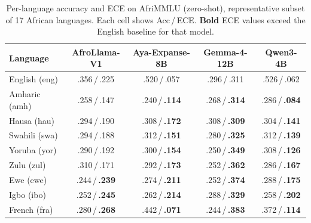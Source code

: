 \documentclass[11pt,a4paper]{article}
\begin{document}
\begin{table}[H]
\centering
\caption{Per-language accuracy and ECE on AfriMMLU (zero-shot), representative
  subset of 17 African languages. Each cell shows Acc\,/\,ECE.
  \textbf{Bold} ECE values exceed the English baseline for that model.}
\label{tab:afrimmlu_lang}
\small
\begin{tabular}{lcccc}
\toprule
\textbf{Language} & \textbf{AfroLlama-V1} & \textbf{Aya-Expanse-8B}
                  & \textbf{Gemma-4-12B}  & \textbf{Qwen3-4B} \\
\midrule
English (eng) & .356\,/\,.225 & .520\,/\,.057 & .296\,/\,.311 & .526\,/\,.062 \\
\midrule
Amharic (amh) & .258\,/\,.147 & .240\,/\,\textbf{.114} & .268\,/\,\textbf{.314} & .286\,/\,\textbf{.084} \\
Hausa (hau)   & .294\,/\,.190 & .308\,/\,\textbf{.172} & .308\,/\,\textbf{.309} & .304\,/\,\textbf{.141} \\
Swahili (swa) & .294\,/\,.188 & .312\,/\,\textbf{.151} & .280\,/\,\textbf{.325} & .312\,/\,\textbf{.139} \\
Yoruba (yor)  & .290\,/\,.192 & .300\,/\,\textbf{.154} & .250\,/\,\textbf{.349} & .308\,/\,\textbf{.126} \\
Zulu (zul)    & .310\,/\,.171 & .292\,/\,\textbf{.173} & .252\,/\,\textbf{.362} & .286\,/\,\textbf{.167} \\
Ewe (ewe)     & .244\,/\,\textbf{.239} & .274\,/\,\textbf{.211} & .252\,/\,\textbf{.374} & .288\,/\,\textbf{.175} \\
Igbo (ibo)    & .252\,/\,\textbf{.245} & .262\,/\,\textbf{.214} & .288\,/\,\textbf{.329} & .258\,/\,\textbf{.202} \\
French (fra)  & .280\,/\,\textbf{.268} & .442\,/\,\textbf{.071} & .244\,/\,\textbf{.383} & .372\,/\,\textbf{.114} \\
\bottomrule
\end{tabular}
\end{table}
\end{document}
